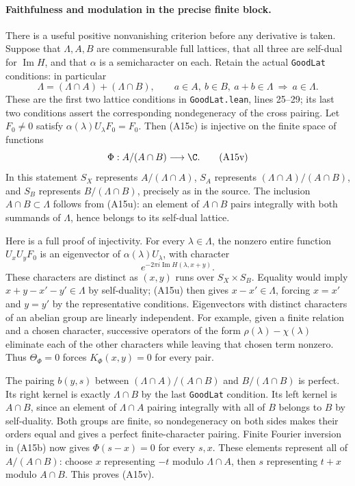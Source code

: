 \documentclass[11pt]{article}
\theoremstyle{definition}\newtheorem{definition}[theorem]{Definition}\newtheorem{remark}[theorem]{Remark}
\begin{document}
\paragraph{Faithfulness and modulation in the precise finite block.}
There is a useful positive nonvanishing criterion before any derivative
is taken.  Suppose that $\Lambda,A,B$ are commensurable full lattices,
that all three are self-dual for $\operatorname{Im}H$, and that
$\alpha$ is a semicharacter on each.  Retain the actual
\texttt{GoodLat} conditions: in particular
\[
 \Lambda=(\Lambda\cap A)+(\Lambda\cap B),\qquad
 a\in A,\ b\in B,\ a+b\in\Lambda\ \Longrightarrow\ a\in\Lambda.
 \tag{A15u}
\]
These are the first two lattice conditions in
\texttt{GoodLat.lean}, lines 25--29; its last two conditions assert
the corresponding nondegeneracy of the cross pairing.
Let $F_0\ne0$ satisfy $\alpha(\lambda)U_\lambda F_0=F_0$.
Then (A15c) is injective on the finite space of functions
\[
                 \Phi:A/(A\cap B)\longrightarrow\C.
 \tag{A15v}
\]
In this statement $S_X$ represents $A/(\Lambda\cap A)$,
$S_A$ represents $(\Lambda\cap A)/(A\cap B)$, and $S_B$
represents $B/(\Lambda\cap B)$, precisely as in the source.
The inclusion $A\cap B\subset\Lambda$ follows from (A15u): an
element of $A\cap B$ pairs integrally with both summands of
$\Lambda$, hence belongs to its self-dual lattice.

Here is a full proof of injectivity.  For every $\lambda\in\Lambda$,
the nonzero entire function $U_xU_yF_0$ is an eigenvector of
$\alpha(\lambda)U_\lambda$, with character
\[
             e^{-2\pi i\operatorname{Im}H(\lambda,x+y)}.
\]
These characters are distinct as $(x,y)$ runs over $S_X\times S_B$.
Equality would imply $x+y-x'-y'\in\Lambda$ by self-duality;
(A15u) then gives $x-x'\in\Lambda$, forcing $x=x'$ and $y=y'$
by the representative conditions.  Eigenvectors with distinct
characters of an abelian group are linearly independent.  For
example, given a finite relation and a chosen character, successive
operators of the form $\rho(\lambda)-\chi(\lambda)$ eliminate
each of the other characters while leaving that chosen term
nonzero.  Thus $\Theta_\Phi=0$ forces $K_\Phi(x,y)=0$ for every
pair.

The pairing $b(y,s)$ between
$(\Lambda\cap A)/(A\cap B)$ and $B/(\Lambda\cap B)$ is perfect.
Its right kernel is exactly $\Lambda\cap B$ by the last
\texttt{GoodLat} condition.  Its left kernel is $A\cap B$, since
an element of $\Lambda\cap A$ pairing integrally with all of $B$
belongs to $B$ by self-duality.  Both groups are finite, so
nondegeneracy on both sides makes their orders equal and gives a
perfect finite-character pairing.  Finite Fourier inversion in
(A15b) now gives $\Phi(s-x)=0$ for every $s,x$.
These elements represent all of $A/(A\cap B)$: choose $x$
representing $-t$ modulo $\Lambda\cap A$, then $s$ representing
$t+x$ modulo $A\cap B$.  This proves (A15v).
\end{document}
